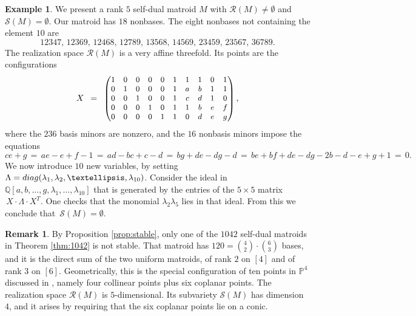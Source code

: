 \documentclass[12pt]{extarticle}
\theoremstyle{definition}
\newtheorem{remark}[theorem]{Remark}
\newtheorem{example}[theorem]{Example}
\numberwithin{theorem}{section}
\theoremstyle{plain}\newtheorem{ithm}{Theorem}
\newcommand{\PP}{\mathbb{P}}
\newcommand{\QQ}{\mathbb{Q}}
\begin{document}
\begin{example} \label{ex:interesting}
We present a rank $5$ self-dual matroid $M$ with $\mathcal{R}(M) \not= \emptyset$
and $\mathcal{S}(M) = \emptyset$. Our matroid has $18$ nonbases. The eight nonbases
not containing the element $10$ are
$$ 12347,\, 12369,\, 12468,\, 12789,\, 13568,\, 14569,\, 23459,\, 23567,\, 36789. $$
The realization space $\mathcal{R}(M)$ is a very affine threefold. Its points are the configurations
$$
X \,\,\, = \,\,\, \begin{small}
\begin{pmatrix}
1 & 0 & 0 & 0 & 0 & 1 & 1 & 1 & 0 & 1 \\
 0 & 1 & 0 & 0 & 0 & 1 & a & b & 1 & 1 \\
 0 & 0 & 1 & 0 & 0 & 1 & c & d & 1 & 0 \\
 0 & 0 & 0 & 1 & 0 & 1 & 1 & b & e & f \\
 0 & 0 & 0 & 0 & 1 & 1 & 0 & d & e & g
 \end{pmatrix}, \end{small}
 $$
 where the $236$ basis minors are nonzero, and the $16$ nonbasis minors impose the equations
  $$ \!
ce{+}g \,=\, a e {-} e {+} f{-} 1 \,=\, a d {-} b c{+}c{-}d \, = \,
  b g {+} d e {-} d g {-} d \,=\, b e {+} b f {+} d e {-} d g {-} 2 b {-} d{-}e {+} g{+}1\, = \, 0.
  $$
  We now introduce $10$ new variables, by setting  $\Lambda = {\rm diag}(\lambda_1,\lambda_2,\ldots,\lambda_{10})$.
 Consider  the ideal  in $\QQ[a,b,\ldots, g, \lambda_1,\ldots,\lambda_{10}]$ that is
  generated by the entries of the $5 \times 5$ matrix     $\,X \cdot \Lambda \cdot X^T $.
  One checks that   the monomial  $\lambda_2 \lambda_5$ lies in that ideal. From this
  we conclude that    $\,\mathcal{S}(M) = \emptyset$.  
\end{example}

\begin{remark} By Proposition \ref{prop:stable}, only
 one of the $1042$ self-dual matroids in Theorem \ref{thm:1042}
is not stable. That matroid  has $120 =\binom{4}{2} \cdot \binom{6}{3} $ bases,
and it is the direct sum of the  two uniform matroids, of rank $2$ on $[4]$
and of rank $3$ on $[6]$. Geometrically, this is the special configuration 
of ten points in $\PP^4$  discussed
in \cite[Remark 3, page 47]{DO}, namely
four collinear points plus six coplanar points.
The realization space $\mathcal{R}(M) $ is $5$-dimensional.
Its subvariety $\mathcal{S}(M)$ has dimension $4$, and it 
arises by requiring that the six coplanar points lie on a conic.
\end{remark}
\end{document}
